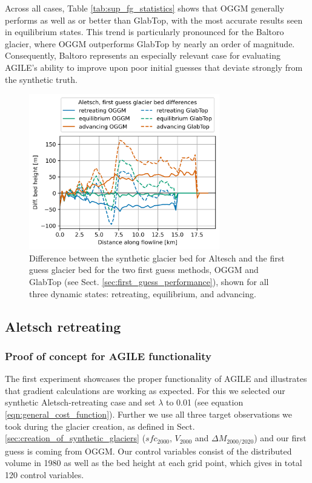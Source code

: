 \documentclass[journal abbreviation, manuscript]{copernicus}
\begin{document}
Across all cases, Table \ref{tab:sup_fg_statistics} shows that OGGM generally performs as well as or better than GlabTop, with the most accurate results seen in equilibrium states. This trend is particularly pronounced for the Baltoro glacier, where OGGM outperforms GlabTop by nearly an order of magnitude. Consequently, Baltoro represents an especially relevant case for evaluating AGILE’s ability to improve upon poor initial guesses that deviate strongly from the synthetic truth.

\begin{figure}
    \centering
    \includegraphics[width=8.3cm]{fig03.png}
    \caption{Difference between the synthetic glacier bed for Altesch and the first guess glacier bed for the two first guess methods, OGGM and GlabTop (see Sect. \ref{sec:first_guess_performance}), shown for all three dynamic states: retreating, equilibrium, and advancing.}
    \label{fig:aletsch_fg_bed}
\end{figure}


\subsection{Aletsch retreating}
\label{sec:aletsch_retreating}

\subsubsection{Proof of concept for AGILE functionality}
\label{subsec:prove of concept}

The first experiment showcases the proper functionality of AGILE and illustrates that gradient calculations are working as expected. For this we selected our synthetic Aletsch-retreating case and set $\lambda$ to 0.01 (see equation \ref{eqn:general_cost_function}). Further we use all three target observations we took during the glacier creation, as defined in Sect. \ref{sec:creation_of_synthetic_glaciers} ($sfc_{2000}$, $V_{2000}$ and $\Delta M_{2000/2020}$) and our first guess is coming from OGGM. Our control variables consist of the distributed volume in 1980 as well as the bed height at each grid point, which gives in total 120 control variables.
\end{document}
